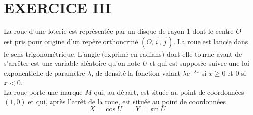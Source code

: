 \documentclass[11pt]{article}%
\begin{document}
\section*{EXERCICE III}

La roue d'une loterie est représentée par un disque de rayon 1 dont le
centre $O$ est pris pour origine d'un repère orthonormé $\left(
O,\overset{\rightarrow }{i},\overset{\rightarrow }{j}\right) $. La roue
est lancée dans
le sens trigonométrique. L'angle (exprimé en radians) dont elle tourne
avant
de s'arrêter est une variable aléatoire qu'on note $U$ et qui est
supposée
suivre une loi exponentielle de paramètre $\lambda $, de densité la
fonction
valant $\lambda e^{-\lambda x}$ si $x\geq 0$ et 0 si $x<0$.\\
La roue porte une marque $M$ qui, au départ, est située au point de
coordonnées $(1,0)$ et qui, après l'arrêt de la roue, est située au
point de coordonnées 
\[
X = \cos {U}\qquad Y = \sin {U}
\]
\end{document}
